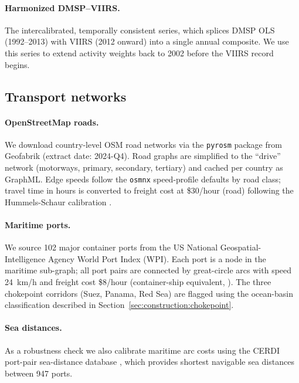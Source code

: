 \documentclass[11pt, a4paper]{article}
\begin{document}
\paragraph{Harmonized DMSP--VIIRS.}
The \citet{li_zhou_zhao_zhao_2020} intercalibrated, temporally consistent
series, which splices DMSP OLS (1992--2013) with VIIRS (2012 onward) into a
single annual composite. We use this series to extend activity weights back to
2002 before the VIIRS record begins.

\subsection{Transport networks}
\label{sec:data:transport}

\paragraph{OpenStreetMap roads.}
We download country-level OSM road networks via the \texttt{pyrosm} package
from Geofabrik (extract date: 2024-Q4). Road graphs are simplified to the
``drive'' network (motorways, primary, secondary, tertiary) and cached per
country as GraphML. Edge speeds follow the \texttt{osmnx} speed-profile
defaults by road class; travel time in hours is converted to freight cost at
\$30/hour (road) following the Hummels-Schaur calibration
\citep{hummels_schaur_2013}.

\paragraph{Maritime ports.} We source 102 major container ports from the
US National Geospatial-Intelligence Agency World Port Index (WPI). Each port
is a node in the maritime sub-graph; all port pairs are connected by
great-circle arcs with speed 24~km/h and freight cost \$8/hour (container-ship
equivalent, \citealp{hummels_schaur_2013}).  The three chokepoint corridors
(Suez, Panama, Red Sea) are flagged using the ocean-basin classification
described in Section~\ref{sec:construction:chokepoint}.

\paragraph{Sea distances.}
As a robustness check we also calibrate maritime arc costs using the
CERDI port-pair sea-distance database \citep{bertoli_freudenberg_stammann_2016},
which provides shortest navigable sea distances between 947 ports.
\end{document}
